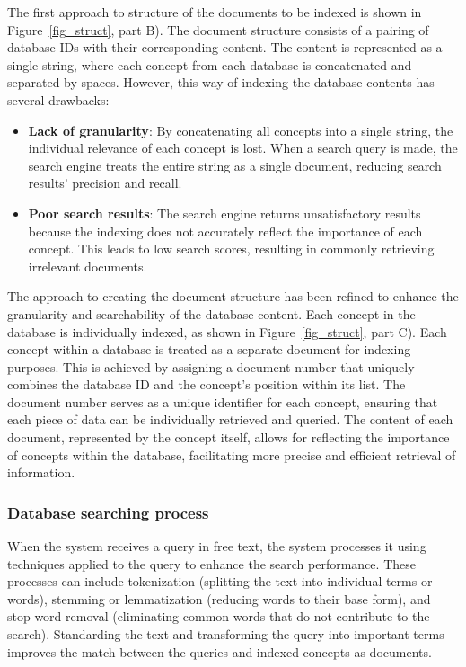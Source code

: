 The first approach to structure of the documents to be indexed is shown in Figure~\ref{fig_struct}, part B). The document structure consists of a pairing of database IDs with their corresponding content. The content is represented as a single string, where each concept from each database is concatenated and separated by spaces. However, this way of indexing the database contents has several drawbacks: 

\begin{itemize}
    \item \textbf{Lack of granularity}: By concatenating all concepts into a single string, the individual relevance of each concept is lost. When a search query is made, the search engine treats the entire string as a single document, reducing search results' precision and recall.
    \item \textbf{Poor search results}: The search engine returns unsatisfactory results because the indexing does not accurately reflect the importance of each concept. This leads to low search scores, resulting in commonly retrieving irrelevant documents.
\end{itemize}

The approach to creating the document structure has been refined to enhance the granularity and searchability of the database content. Each concept in the database is individually indexed, as shown in Figure~\ref{fig_struct}, part C). Each concept within a database is treated as a separate document for indexing purposes. This is achieved by assigning a document number that uniquely combines the database ID and the concept's position within its list. The document number serves as a unique identifier for each concept, ensuring that each piece of data can be individually retrieved and queried. The content of each document, represented by the concept itself, allows for reflecting the importance of concepts within the database, facilitating more precise and efficient retrieval of information.


\subsubsection{Database searching process}
\label{searchprocess}

When the {\ir} system receives a query in free text, the system processes it using {\nlp} techniques applied to the query to enhance the search performance. These processes can include tokenization (splitting the text into individual terms or words), stemming or lemmatization (reducing words to their base form), and stop-word removal (eliminating common words that do not contribute to the search). Standarding the text and transforming the query into important terms improves the match between the queries and indexed concepts as documents.


